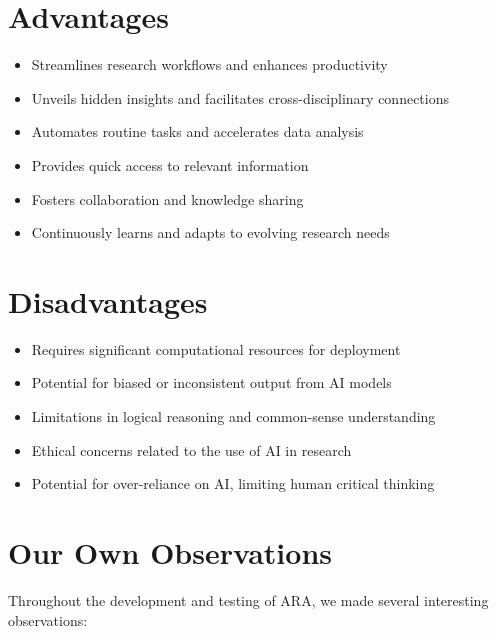 \documentclass{article}
\begin{document}
\section*{Advantages}
\begin{itemize}
    \item Streamlines research workflows and enhances productivity
    \item Unveils hidden insights and facilitates cross-disciplinary connections
    \item Automates routine tasks and accelerates data analysis
    \item Provides quick access to relevant information
    \item Fosters collaboration and knowledge sharing
    \item Continuously learns and adapts to evolving research needs
\end{itemize}

\section*{Disadvantages}
\begin{itemize}
    \item Requires significant computational resources for deployment
    \item Potential for biased or inconsistent output from AI models
    \item Limitations in logical reasoning and common-sense understanding
    \item Ethical concerns related to the use of AI in research
    \item Potential for over-reliance on AI, limiting human critical thinking
\end{itemize}

\section*{Our Own Observations}
Throughout the development and testing of ARA, we made several interesting observations:
\end{document}

